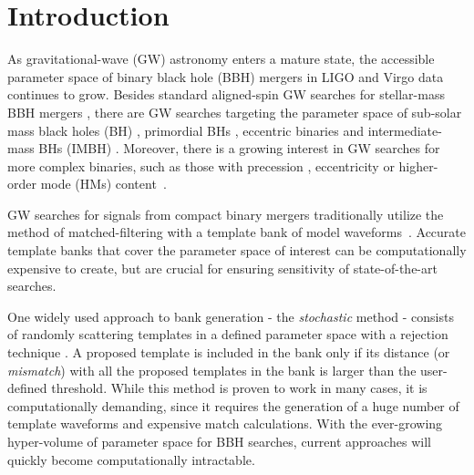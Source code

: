 \documentclass[twocolumn,showpacs,preprintnumbers,nofootinbib,prd,
superscriptaddress,10pt]{revtex4-2}
\begin{document}

\section{Introduction}

As gravitational-wave (GW) astronomy enters a mature state, the accessible parameter space of binary black hole (BBH) mergers in LIGO \cite{LIGOScientific:2014pky} and Virgo \cite{VIRGO:2014yos} data continues to grow. Besides standard aligned-spin GW searches for stellar-mass BBH mergers \cite{GWTC-1,GWTC-2,GWTC-2.1, GWTC-3}, there are GW searches targeting the parameter space of sub-solar mass black holes (BH) \cite{SSM_O2, SSM_O3a, PhysRevD.106.023024, Nitz:2021mzz}, primordial BHs \cite{PBH}, eccentric binaries \cite{PhysRevD.102.043005, PhysRevD.104.104016, Nitz:2019spj} and intermediate-mass BHs (IMBH) \cite{IMBH_O2, IMBH_O3, Chandra:2022ixv}. Moreover, there is a growing interest in GW searches for more complex binaries, such as those with precession \cite{PhysRevD.89.024010, Harry:2017weg, PhysRevD.102.041302, Indik:2016qky, Harry:2016ijz}, eccentricity \cite{LIGOScientific:2019dag, Ramos-Buades:2020eju, Wang:2021qsu, Nitz:2021mzz} or higher-order mode (HMs) content~\cite{CalderonBustillo:2015lrt, Harry:2017weg, Chandra_hom, 2021PhRvD.103b4042M}.

GW searches for signals from compact binary mergers traditionally utilize the method of matched-filtering with a template bank of model waveforms~\cite{Sathyaprakash:1991mt, Dhurandhar:1992mw, Owen:1998dk, Allen:2005fk, Babak:2006ty, Cokelaer:2007mv}. Accurate template banks that cover the parameter space of interest can be computationally expensive to create, but are crucial for ensuring sensitivity of state-of-the-art searches.

One widely used approach to bank generation - the {\it stochastic} method \cite{Harry:2009ea, PhysRevD.80.104014, Ajith:2012mn} - consists of randomly scattering templates in a defined parameter space with a rejection technique \cite{DalCanton:2017ala, Mukherjee:2018yra, Indik:2016qky, Lenon:2021zac}. A proposed template is included in the bank only if its distance (or {\it mismatch}) with all the proposed templates in the bank is larger than the user-defined threshold.
While this method is proven to work in many cases, it is computationally demanding, since it requires the generation of a huge number of template waveforms and expensive match calculations.
With the ever-growing hyper-volume of parameter space for BBH searches, current approaches will quickly become computationally intractable.
\end{document}
